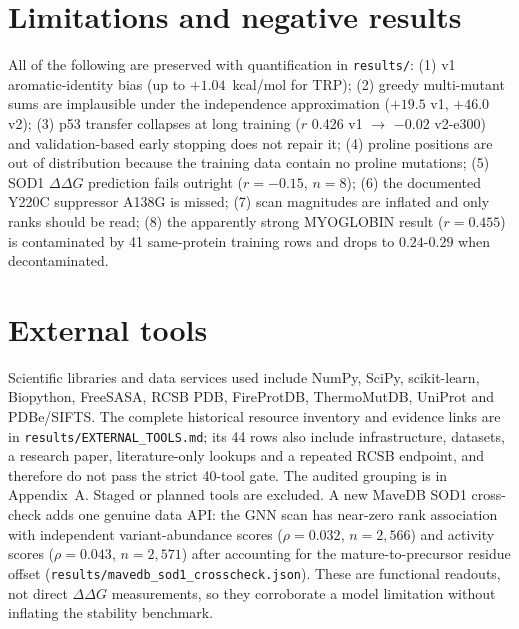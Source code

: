 \documentclass[11pt]{article}
\begin{document}
\section{Limitations and negative results}
\label{sec:limits}
All of the following are preserved with quantification in
\texttt{results/}: (1) v1 aromatic-identity bias (up to
$+1.04$~kcal/mol for TRP); (2) greedy multi-mutant sums are implausible
under the independence approximation ($+19.5$ v1, $+46.0$ v2); (3) p53
transfer collapses at long training ($r$ 0.426 v1 $\to$ $-0.02$
v2-e300) and validation-based early stopping does not repair it; (4)
proline positions are out of distribution because the training data
contain no proline mutations; (5) SOD1 $\Delta\Delta G$ prediction
fails outright ($r=-0.15$, $n=8$); (6) the documented Y220C suppressor
A138G is missed; (7) scan magnitudes are inflated and only ranks should
be read; (8) the apparently strong MYOGLOBIN result ($r=0.455$) is
contaminated by 41 same-protein training rows and drops to
$0.24$-$0.29$ when decontaminated.

\section{External tools}
\label{sec:tools}
Scientific libraries and data services used include NumPy, SciPy, scikit-learn,
Biopython, FreeSASA, RCSB PDB, FireProtDB, ThermoMutDB, UniProt and
PDBe/SIFTS. The complete historical resource inventory and evidence links
are in \texttt{results/EXTERNAL\_TOOLS.md}; its 44 rows also include
infrastructure, datasets, a research paper, literature-only lookups and a
repeated RCSB endpoint, and therefore do not pass the strict 40-tool gate.
The audited grouping is in Appendix~A. Staged or planned tools are excluded.
A new MaveDB SOD1 cross-check adds one genuine data API: the GNN scan has
near-zero rank association with independent variant-abundance scores
($\rho=0.032$, $n=2{,}566$) and activity scores
($\rho=0.043$, $n=2{,}571$) after accounting for the mature-to-precursor
residue offset (\texttt{results/mavedb\_sod1\_crosscheck.json}). These
are functional readouts, not direct $\Delta\Delta G$ measurements, so they
corroborate a model limitation without inflating the stability benchmark.


\clearpage
\appendix










\end{document}
